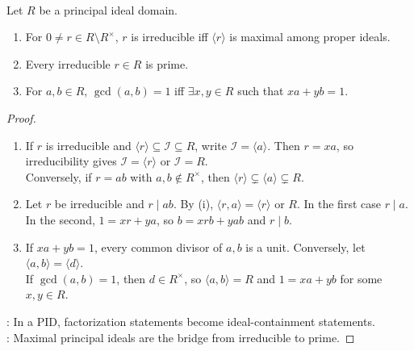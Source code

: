 \begin{theorem} \label{thm:pid-prime-irreducible-bezout} \\
Let $R$ be a principal ideal domain.
\begin{enumerate}[label=(\roman*)]
\setlength{\itemsep}{0pt}
\item For $0\neq r\in R\setminus R^\times$, $r$ is irreducible iff $\langle r\rangle$ is maximal among proper ideals.
\item Every irreducible $r\in R$ is prime.
\item For $a,b\in R$, $\gcd(a,b)=1$ iff $\exists x,y\in R$ such that $xa+yb=1$.
\end{enumerate}
\begin{proof}
\begin{enumerate}[label=(\roman*)]
\setlength{\itemsep}{0pt}
\item If $r$ is irreducible and $\langle r\rangle\subseteq\mathcal{I}\subseteq R$, write $\mathcal{I}=\langle a\rangle$. Then $r=xa$, so irreducibility gives $\mathcal{I}=\langle r\rangle$ or $\mathcal{I}=R$.\\
Conversely, if $r=ab$ with $a,b\notin R^\times$, then $\langle r\rangle\subsetneq\langle a\rangle\subsetneq R$.
\item Let $r$ be irreducible and $r\mid ab$. By (i), $\langle r,a\rangle=\langle r\rangle$ or $R$. In the first case $r\mid a$.\\
In the second, $1=xr+ya$, so $b=xrb+yab$ and $r\mid b$.
\item If $xa+yb=1$, every common divisor of $a,b$ is a unit. Conversely, let $\langle a,b\rangle=\langle d\rangle$.\\
If $\gcd(a,b)=1$, then $d\in R^\times$, so $\langle a,b\rangle=R$ and $1=xa+yb$ for some $x,y\in R$.
\end{enumerate}
: In a PID, factorization statements become ideal-containment statements.\\
: Maximal principal ideals are the bridge from irreducible to prime.
\end{proof}
\end{theorem}

